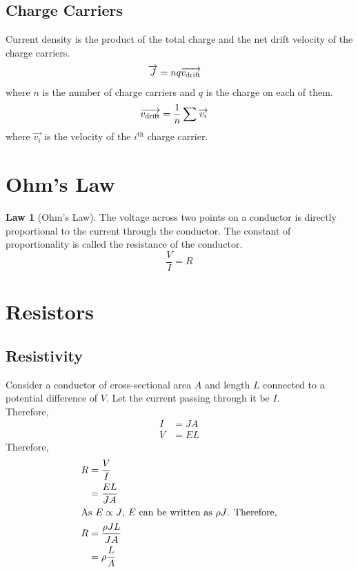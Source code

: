 \documentclass[fleqn, a4paper, 12pt, twoside]{article}
\theoremstyle{definition}
\theoremstyle{theorem}
\newtheorem{law}{Law}
\begin{document}
\subsection{Charge Carriers}

Current density is the product of the total charge and the net drift velocity of the charge carriers.
\begin{align*}
	\overrightarrow{J} & = n q \overrightarrow{v_{\textnormal{drift}}}
\end{align*}
where $n$ is the number of charge carriers and $q$ is the charge on each of them.
\begin{align*}
	\overrightarrow{v_{\textnormal{drift}}} & = \frac{1}{n} \sum \overrightarrow{v_i}
\end{align*}
where $\overrightarrow{v_i}$ is the velocity of the $i^{\text{th}}$ charge carrier.

\section{Ohm's Law}

\begin{law}[Ohm's Law]
	The voltage across two points on a conductor is directly proportional to the current through the conductor.
	The constant of proportionality is called the resistance of the conductor.
	\begin{equation*}
		\frac{V}{I} = R
	\end{equation*}
\end{law}

\section{Resistors}

\subsection{Resistivity}

Consider a conductor of cross-sectional area $A$ and length $L$ connected to a potential difference of $V$.
Let the current passing through it be $I$.\\
Therefore,
\begin{align*}
	I & = J A \\
	V & = E L
\end{align*}
Therefore,
\begin{align*}
	R & = \frac{V}{I}          \\
          & = \frac{E L}{J A}      \\
	\intertext{As $E \propto J$, $E$ can be written as $\rho J$. Therefore,}
	R & = \frac{\rho J L}{J A} \\
          & = \rho \frac{L}{A}
\end{align*}
\end{document}
